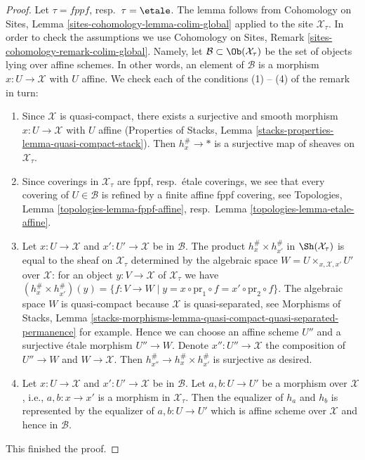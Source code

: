 \begin{proof}
Let $\tau = fppf$, resp.\ $\tau = \etale$. The lemma follows from
Cohomology on Sites, Lemma \ref{sites-cohomology-lemma-colim-global}
applied to the site $\mathcal{X}_\tau$. In order to check the assumptions we
use Cohomology on Sites, Remark \ref{sites-cohomology-remark-colim-global}.
Namely, let $\mathcal{B} \subset \Ob(\mathcal{X}_\tau)$ be the set
of objects lying over affine schemes. In other words, an element
of $\mathcal{B}$ is a morphism $x : U \to \mathcal{X}$ with $U$ affine.
We check each of the conditions (1) -- (4) of the remark in turn:
\begin{enumerate}
\item Since $\mathcal{X}$ is quasi-compact, there exists a
surjective and smooth morphism $x : U \to \mathcal{X}$ with $U$ affine
(Properties of Stacks, Lemma
\ref{stacks-properties-lemma-quasi-compact-stack}).
Then $h_x^\# \to *$ is a surjective map of sheaves on $\mathcal{X}_\tau$.
\item Since coverings in $\mathcal{X}_\tau$ are fppf, resp.\ \'etale
coverings, we see that every covering of $U \in \mathcal{B}$ is refined
by a finite affine fppf covering, see
Topologies, Lemma \ref{topologies-lemma-fppf-affine},
resp.\ Lemma \ref{topologies-lemma-etale-affine}.
\item Let $x : U \to \mathcal{X}$ and $x' : U' \to \mathcal{X}$ be
in $\mathcal{B}$. The product $h_x^\# \times h_{x'}^\#$ in
$\Sh(\mathcal{X}_\tau)$ is equal to the sheaf on $\mathcal{X}_\tau$
determined by the algebraic space $W = U \times_{x, \mathcal{X}, x'} U'$ over
$\mathcal{X}$: for an object $y : V \to \mathcal{X}$ of
$\mathcal{X}_\tau$ we have
$(h_x^\# \times h_{x'}^\#)(y) = \{f : V \to W \mid y =
x \circ \text{pr}_1 \circ f = x' \circ \text{pr}_2 \circ f\}$.
The algebraic space $W$ is quasi-compact because $\mathcal{X}$
is quasi-separated, see Morphisms of Stacks, Lemma
\ref{stacks-morphisms-lemma-quasi-compact-quasi-separated-permanence}
for example. Hence we can choose an affine scheme $U''$ and
a surjective \'etale morphism $U'' \to W$. Denote $x'' : U'' \to \mathcal{X}$
the composition of $U'' \to W$ and $W \to \mathcal{X}$. Then
$h_{x''}^\# \to h_x^\# \times h_{x'}^\#$ is surjective as desired.
\item Let $x : U \to \mathcal{X}$ and $x' : U' \to \mathcal{X}$ be
in $\mathcal{B}$. Let $a, b : U \to U'$ be a morphism over $\mathcal{X}$,
i.e., $a, b  : x \to x'$ is a morphism in $\mathcal{X}_\tau$.
Then the equalizer of $h_a$ and $h_b$ is represented by the
equalizer of $a, b : U \to U'$ which is
affine scheme over $\mathcal{X}$ and hence in $\mathcal{B}$.
\end{enumerate}
This finished the proof.
\end{proof}


